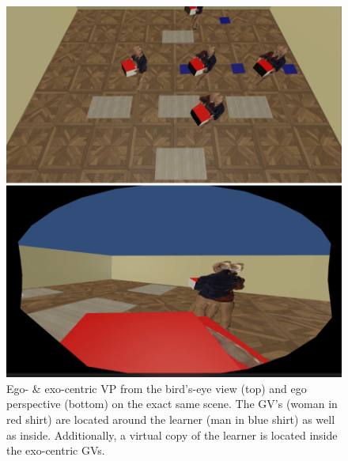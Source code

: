 \begin{figure}[H]
	\centering
	\includegraphics[width=\textwidth]{figures/perspectiveEGOEXO.png}
	\caption[Ego- \& exo-centric visual perspective]{Ego- \& exo-centric VP from the bird's-eye view (top) and ego perspective (bottom) on the exact same scene. The GV's (woman in red shirt) are located around the learner (man in blue shirt) as well as inside. Additionally, a virtual copy of the learner is located inside the exo-centric GVs.}
	\label{fig:egoexo}
\end{figure}

